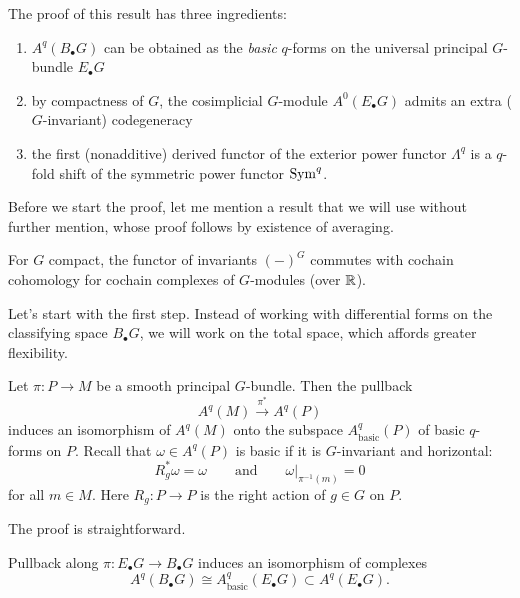\documentclass{amsart}
\begin{document}
The proof of this result has three ingredients:
\begin{enumerate}
    \item $A^q(B_\bullet G)$ can be obtained as the \textit{basic} 
        $q$-forms on the universal principal $G$-bundle $E_\bullet G$
    \item by compactness of $G$, the cosimplicial $G$-module $A^0(E_\bullet 
        G)$ admits an extra ($G$-invariant) codegeneracy
    \item the first (nonadditive) derived functor of the
        exterior power functor $\Lambda^q$ is a $q$-fold shift of the symmetric
        power functor $\operatorname{Sym}^q$.
\end{enumerate}

Before we start the proof, let me mention a result that we will use without 
further mention, whose proof follows by existence of averaging.
\begin{lemma}
    For $G$ compact, the functor of invariants $(-)^G$ commutes with cochain 
    cohomology for cochain complexes of $G$-modules (over $\mathbb{R}$).
\end{lemma}


Let's start with the first step. Instead of working with differential forms on 
the classifying space $B_\bullet G$, we will work on the total space, which 
affords greater flexibility.

\begin{proposition}
    Let $\pi: P\to M$ be a smooth principal $G$-bundle. Then the pullback 
    \begin{equation*}
        A^q(M) \xrightarrow{\pi^*} A^q(P)
    \end{equation*}
    induces an isomorphism of $A^q(M)$ onto the subspace $A^q_\text{basic}(P)$ 
    of basic $q$-forms on $P$. Recall that $\omega\in A^q(P)$ is basic if it is 
    $G$-invariant and horizontal:
    \begin{equation*}
        R_g^*\omega = \omega \qquad \text{and} \qquad \omega|_{\pi^{-1}(m)}=0
    \end{equation*}
    for all $m\in M$. Here $R_g: P\to P$ is the right action of $g\in G$ on $P$.
\end{proposition}
The proof is straightforward.

\begin{corollary}
    Pullback along $\pi: E_\bullet G \to B_\bullet G$ induces an isomorphism
    of complexes
    \begin{equation*}
        A^q(B_\bullet G) \cong A^q_\text{basic}(E_\bullet G) \subset 
        A^q(E_\bullet G).
    \end{equation*}
\end{corollary}
\end{document}
